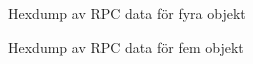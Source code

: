 \begin{figure}[H]
    \scriptsize
    \center
    
    \caption{Hexdump av RPC data för fyra objekt}
    \label{fig:tim-rpcdata4}
\end{figure}

\begin{figure}[H]
    \scriptsize
    \center
    
    \caption{Hexdump av RPC data för fem objekt}
    \label{fig:tim-rpcdata5}
\end{figure}
